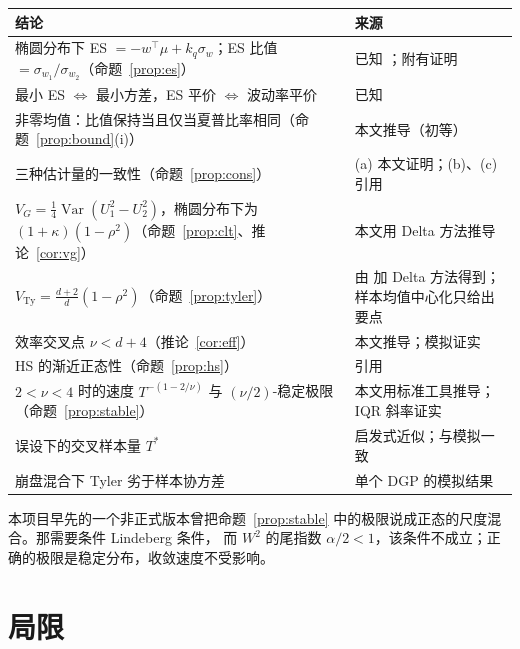 \documentclass[11pt,UTF8]{ctexart}
\newcommand{\Var}{\operatorname{Var}}
\begin{document}
\begin{table}[H]
\centering\small
\begin{tabular}{p{}p{}}
\toprule
结论 & 来源 \\
\midrule
椭圆分布下 ES $=-w^\top\mu+k_q\sigma_w$；ES 比值 $=\sigma_{w_1}/\sigma_{w_2}$（命题~\ref{prop:es}） & 已知 \citep{mcneil2015}；附有证明 \\
最小 ES $\Leftrightarrow$ 最小方差，ES 平价 $\Leftrightarrow$ 波动率平价 & 已知 \citep{tasche1999,mcneil2015} \\
非零均值：比值保持当且仅当夏普比率相同（命题~\ref{prop:bound}(i)） & 本文推导（初等） \\
三种估计量的一致性（命题~\ref{prop:cons}） & (a) 本文证明；(b)、(c) 引用 \\
$V_G=\frac14\Var(U_1^2-U_2^2)$，椭圆分布下为 $(1+\kappa)(1-\rho^2)$（命题~\ref{prop:clt}、推论~\ref{cor:vg}） & 本文用 Delta 方法推导 \\
$V_{\mathrm{Ty}}=\frac{d+2}d(1-\rho^2)$（命题~\ref{prop:tyler}） & 由 \citet{tyler1987} 加 Delta 方法得到；样本均值中心化只给出要点 \\
效率交叉点 $\nu<d+4$（推论~\ref{cor:eff}） & 本文推导；模拟证实 \\
HS 的渐近正态性（命题~\ref{prop:hs}） & 引用 \citep{chen2008} \\
$2<\nu<4$ 时的速度 $T^{-(1-2/\nu)}$ 与 $(\nu/2)$-稳定极限（命题~\ref{prop:stable}） & 本文用标准工具推导；IQR 斜率证实 \\
误设下的交叉样本量 $T^*$ & 启发式近似；与模拟一致 \\
崩盘混合下 Tyler 劣于样本协方差 & 单个 DGP 的模拟结果 \\
\bottomrule
\end{tabular}
\end{table}

本项目早先的一个非正式版本曾把命题~\ref{prop:stable} 中的极限说成正态的尺度混合。那需要条件 Lindeberg 条件，
而 $W^2$ 的尾指数 $\alpha/2<1$，该条件不成立；正确的极限是稳定分布，收敛速度不受影响。

\section{局限}
\end{document}
